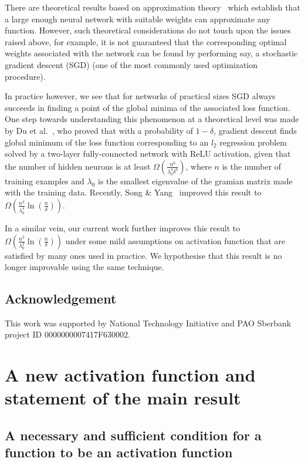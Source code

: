 \documentclass[a4paper,11pt]{amsart}
\theoremstyle{definition}
\theoremstyle{plain}
\theoremstyle{remark}
\begin{document}
There are theoretical results based on approximation theory~\cite{proofNeural} which establish that a large enough neural network with suitable weights can approximate any function.
However, such theoretical considerations do not touch upon the issues raised above, for example, it is not  guaranteed that the corresponding optimal weights associated with the network can be found by performing say, a stochastic gradient descent (SGD) (one of the most commonly used optimization procedure).

In practice however, we see that for networks of practical sizes SGD always succeeds in finding a point of the global minima of the associated loss function.
One step towards understanding this phenomenon at a theoretical level was made by Du et al.~\cite{gdescentOverPara1}, who proved that with a probability of $1-\delta$, gradient descent finds global minimum of the loss function corresponding to an $l_2$ regression problem solved by a two-layer fully-connected network with ReLU activation, given that the number of hidden neurons is at least $\Omega \left(\frac{n^6}{\lambda_0^4\delta^3}\right)$, where $n$ is the number of training examples and $\lambda_0$ is the smallest eigenvalue of the gramian matrix made with the training data. Recently, Song \& Yang~\cite{gdescentOverPara2} improved this result to $\Omega \left(\frac{n^4}{\lambda_0^4}\ln\left(\frac{n}{\delta}\right)\right)$. 

In a similar vein, our current work further improves this result to $\Omega \left(\frac{n^2}{\lambda_0^2}\ln\left(\frac{n}{\delta}\right)\right)$ under some mild assumptions on activation function that are satisfied by many ones used in practice. We hypothesise that this result is no longer improvable using the same technique.

\subsection*{Acknowledgement}

This work was supported by National Technology Initiative and PAO Sberbank project ID 0000000007417F630002.

\section{A new activation function and statement of the main result}

\subsection{A necessary and sufficient condition for a function to be an activation function}
\end{document}
